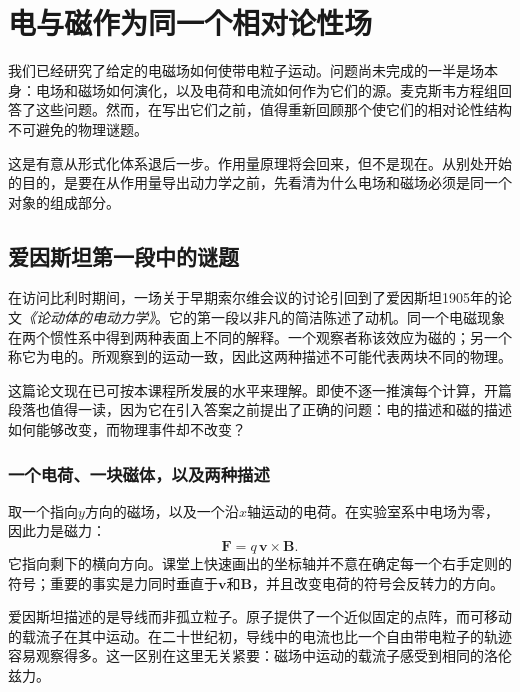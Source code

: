 \chapter{电与磁作为同一个相对论性场}

我们已经研究了给定的电磁场如何使带电粒子运动。问题尚未完成的一半是场本身：电场和磁场如何演化，以及电荷和电流如何作为它们的源。麦克斯韦方程组回答了这些问题。然而，在写出它们之前，值得重新回顾那个使它们的相对论性结构不可避免的物理谜题。

这是有意从形式化体系退后一步。作用量原理将会回来，但不是现在。从别处开始的目的，是要在从作用量导出动力学之前，先看清为什么电场和磁场必须是同一个对象的组成部分。

\section{爱因斯坦第一段中的谜题}

在访问比利时期间，一场关于早期索尔维会议的讨论引回到了爱因斯坦1905年的论文\emph{《论动体的电动力学》}。它的第一段以非凡的简洁陈述了动机。同一个电磁现象在两个惯性系中得到两种表面上不同的解释。一个观察者称该效应为磁的；另一个称它为电的。所观察到的运动一致，因此这两种描述不可能代表两块不同的物理。

这篇论文现在已可按本课程所发展的水平来理解。即使不逐一推演每个计算，开篇段落也值得一读，因为它在引入答案之前提出了正确的问题：电的描述和磁的描述如何能够改变，而物理事件却不改变？

\subsection{一个电荷、一块磁体，以及两种描述}

取一个指向\(y\)方向的磁场，以及一个沿\(x\)轴运动的电荷。在实验室系中电场为零，因此力是磁力：
\begin{equation}
\mathbf F=q\,\mathbf v\times\mathbf B.
\end{equation}
它指向剩下的横向方向。课堂上快速画出的坐标轴并不意在确定每一个右手定则的符号；重要的事实是力同时垂直于\(\mathbf v\)和\(\mathbf B\)，并且改变电荷的符号会反转力的方向。

\begin{classroomqa}
\end{classroomqa}

爱因斯坦描述的是导线而非孤立粒子。原子提供了一个近似固定的点阵，而可移动的载流子在其中运动。在二十世纪初，导线中的电流也比一个自由带电粒子的轨迹容易观察得多。这一区别在这里无关紧要：磁场中运动的载流子感受到相同的洛伦兹力。

